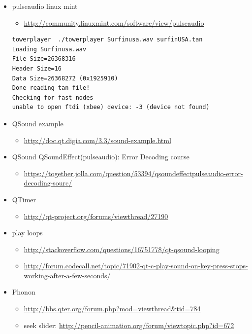 \documentclass[9pt,b5paper]{article}
\begin{document}
\begin{itemize}
\item pulseaudio linux mint
\begin{itemize}
\item \url{http://community.linuxmint.com/software/view/pulseaudio}
\end{itemize}
\begin{verbatim}
towerplayer  ./towerplayer Surfinusa.wav surfinUSA.tan
Loading Surfinusa.wav
File Size=26368316
Header Size=16
Data Size=26368272 (0x1925910)
Done reading tan file!
Checking for fast nodes
unable to open ftdi (xbee) device: -3 (device not found)
\end{verbatim}
\item QSound example
\begin{itemize}
\item \url{http://doc.qt.digia.com/3.3/sound-example.html}
\end{itemize}
\item QSound QSoundEffect(pulseaudio): Error Decoding course  
\begin{itemize}
\item \url{https://together.jolla.com/question/53394/qsoundeffectpulseaudio-error-decoding-sourc/}
\end{itemize}
\item QTimer
\begin{itemize}
\item \url{http://qt-project.org/forums/viewthread/27190}
\end{itemize}
\item play loops
\begin{itemize}
\item \url{http://stackoverflow.com/questions/16751778/qt-qsound-looping}
\item \url{http://forum.codecall.net/topic/71902-qt-c-play-sound-on-key-press-stops-working-after-a-few-seconds/}
\end{itemize}
\item Phonon
\begin{itemize}
\item \url{http://bbs.qter.org/forum.php?mod=viewthread&tid=784}
\item seek slider: \url{http://pencil-animation.org/forum/viewtopic.php?id=672}
\end{itemize}
\end{itemize}
\end{document}
